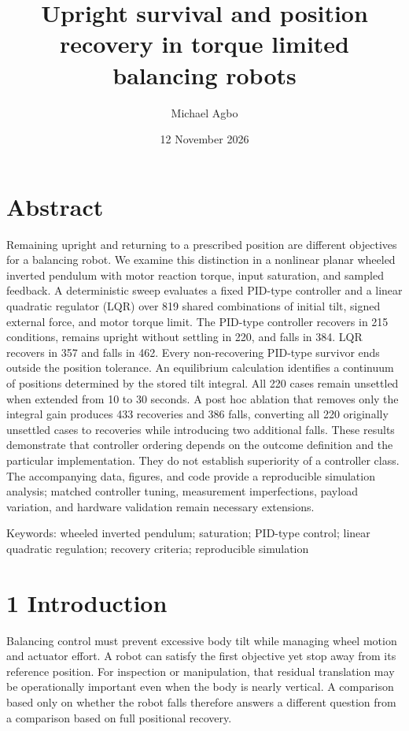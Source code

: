 \documentclass[11pt,a4paper]{article}
\title{Upright survival and position recovery in torque limited balancing robots}
\author{Michael Agbo}
\date{12 November 2026}
\begin{document}
\maketitle
\section*{Abstract}
Remaining upright and returning to a prescribed position are different objectives for a balancing robot. We examine this distinction in a nonlinear planar wheeled inverted pendulum with motor reaction torque, input saturation, and sampled feedback. A deterministic sweep evaluates a fixed PID-type controller and a linear quadratic regulator (LQR) over 819 shared combinations of initial tilt, signed external force, and motor torque limit. The PID-type controller recovers in 215 conditions, remains upright without settling in 220, and falls in 384. LQR recovers in 357 and falls in 462. Every non-recovering PID-type survivor ends outside the position tolerance. An equilibrium calculation identifies a continuum of positions determined by the stored tilt integral. All 220 cases remain unsettled when extended from 10 to 30 seconds. A post hoc ablation that removes only the integral gain produces 433 recoveries and 386 falls, converting all 220 originally unsettled cases to recoveries while introducing two additional falls. These results demonstrate that controller ordering depends on the outcome definition and the particular implementation. They do not establish superiority of a controller class. The accompanying data, figures, and code provide a reproducible simulation analysis; matched controller tuning, measurement imperfections, payload variation, and hardware validation remain necessary extensions.

Keywords: wheeled inverted pendulum; saturation; PID-type control; linear quadratic regulation; recovery criteria; reproducible simulation

\section*{1 Introduction}
Balancing control must prevent excessive body tilt while managing wheel motion and actuator effort. A robot can satisfy the first objective yet stop away from its reference position. For inspection or manipulation, that residual translation may be operationally important even when the body is nearly vertical. A comparison based only on whether the robot falls therefore answers a different question from a comparison based on full positional recovery.
\end{document}
